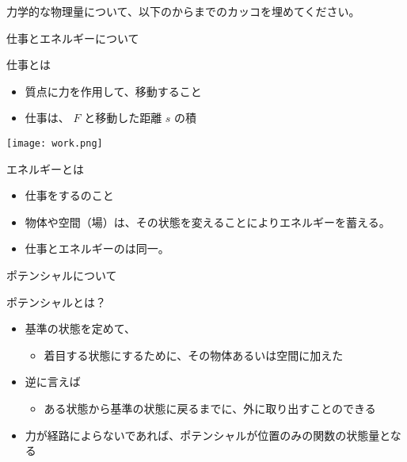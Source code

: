 \documentclass[uplatex,dvipdfmx,a4paper,11pt]{jsarticle}
\begin{document}
\begin{qlist}
	\qitem 力学的な物理量について、以下のからまでのカッコを埋めてください。
		\begin{qlist2}
			\qitem 仕事とエネルギーについて
			\begin{center}
				\begin{minipage}{0.42\textwidth}
					\begin{itembox}[l]{仕事とは}
						\begin{itemize}
							\item 質点に力を作用して、移動すること
							\item 仕事は、\qbox{} $F$ と移動した距離 $s$ の積
						\end{itemize}
							\texttt{[image: work.png]}
					\end{itembox}
				\end{minipage}
				\begin{minipage}{0.42\textwidth}
					\begin{itembox}[l]{エネルギーとは}
						\begin{itemize}
							\item 仕事をする\qbox{}のこと
							\item 物体や空間（場）は、その状態を変えることによりエネルギーを蓄える。
							\item 仕事とエネルギーの\qbox{}は同一。
						\end{itemize}
					\end{itembox}
				\end{minipage}
			\end{center}
			\qitem ポテンシャルについて
				\begin{itembox}[l]{ポテンシャルとは？}
					\begin{itemize}
						\item 基準の状態を定めて、
						\begin{itemize}
							\item 着目する状態にするために、その物体あるいは空間に加えた\qbox{}
						\end{itemize}
						\item 逆に言えば
						\begin{itemize}
							\item ある状態から基準の状態に戻るまでに、外に取り出すことのできる\qbox{}
						\end{itemize}
						\item 力が経路によらない\qbox{}であれば、ポテンシャルが位置のみの関数の状態量となる
					\end{itemize}

\end{itembox}
\end{qlist2}
\end{qlist}
\end{document}
